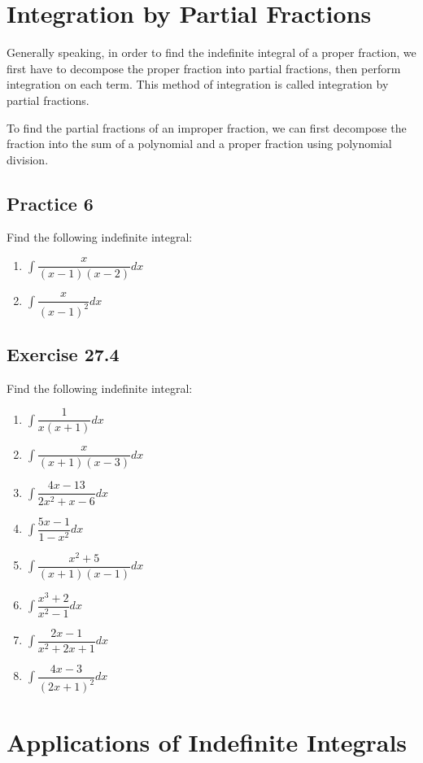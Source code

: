 \documentclass{report}
\begin{document}
\newpage
\section{Integration by Partial Fractions}

Generally speaking, in order to find the indefinite integral of a proper
fraction, we first have to decompose the proper fraction into partial
fractions, then perform integration on each term. This method of integration is
called integration by partial fractions.

To find the partial fractions of an improper fraction, we can first decompose
the fraction into the sum of a polynomial and a proper fraction using
polynomial division.

\subsection{Practice 6}
Find the following indefinite integral:
\begin{enumerate}
    \item $\displaystyle\int\dfrac{x}{(x-1)(x-2)} dx$
    \item $\displaystyle\int\dfrac{x}{(x-1)^2} dx$
\end{enumerate}

\subsection{Exercise 27.4}

Find the following indefinite integral:
\begin{enumerate}
    \item $\displaystyle\int\dfrac{1}{x(x+1)} dx$
    \item $\displaystyle\int\dfrac{x}{(x+1)(x-3)} dx$
    \item $\displaystyle\int\dfrac{4x-13}{2x^2+x-6} dx$
    \item $\displaystyle\int\dfrac{5x-1}{1-x^{2}} dx$
    \item $\displaystyle\int\dfrac{x^{2}+5}{(x+1)(x-1)} dx$
    \item $\displaystyle\int\dfrac{x^{3}+2}{x^{2}-1} dx$
    \item $\displaystyle\int\dfrac{2x-1}{x^{2}+2x+1} dx$
    \item $\displaystyle\int\dfrac{4x-3}{(2x+1)^{2}} dx$
\end{enumerate}

\newpage
\section{Applications of Indefinite Integrals}
\end{document}
